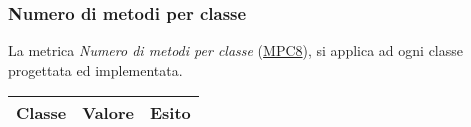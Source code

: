 	
\subsubsection{Numero di metodi per classe}
La metrica \textit{Numero di metodi per classe} (\hyperlink{MPC8}{MPC8}), si applica ad ogni classe progettata ed implementata.

\begin{longtable}{|>{\centering\arraybackslash}p{5cm}|>{\centering\arraybackslash}p{3cm}|>{\centering\arraybackslash}p{3cm}|}
	\hline
	\rowcolor{Gray}
	\textbf{Classe} & \textbf{Valore} & \textbf{Esito} \\
	\hline
	

\end{longtable}
